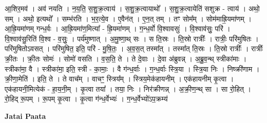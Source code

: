 \documentclass[17pt]{extarticle}
\begin{document}
आ॒शिर॒मव॑ । अव॑ नयति । न॒य॒ति॒ स॒शु॒क्र॒त्वाय॑ । स॒शु॒क्र॒त्वायाथो᳚ । स॒शु॒क्र॒त्वायेति॑ सशुक्र - त्वाय॑ । अथो॒ सम् । अथो॒ इत्यथो᳚ । सम्भ॑रति । भ॒र॒त्ये॒व । ए॒वैन॑त् । ए॒न॒त् तम् । तꣳ सोम᳚म् । सोम॑माह्रि॒यमा॑णम् । आ॒ह्रि॒यमा॑णम् गन्ध॒र्वः । आ॒ह्रि॒यमा॑ण॒मित्या᳚ - ह्रि॒यमा॑णम् । ग॒न्ध॒र्वो वि॒श्वावसुः॑ । वि॒श्वाव॑सुः॒ परि॑ । वि॒श्वाव॑सु॒रिति॑ वि॒श्व - व॒सुः॒ । पर्य॑मुष्णात् । अ॒मु॒ष्णा॒थ् सः । स ति॒स्रः । ति॒स्रो रात्रीः᳚ । रात्रीः॒ परि॑मुषितः । परि॑मुषितोऽवसत् । परि॑मुषित॒ इति॒ परि॑ - मु॒षि॒तः॒ । अ॒व॒स॒त् तस्मा᳚त् । तस्मा᳚त् ति॒स्रः । ति॒स्रो रात्रीः᳚ । रात्रीः᳚ क्री॒तः । क्री॒तः सोमः॑ । सोमो॑ वसति । व॒स॒ति॒ ते । ते दे॒वाः । दे॒वा अ॑ब्रुवन्न् । अ॒ब्रु॒व॒न्थ् स्त्रीका॑माः । स्त्रीका॑मा॒ वै । स्त्रीका॑मा॒ इति॒ स्त्री - का॒माः॒ । वै ग॑न्ध॒र्वाः । ग॒न्ध॒र्वाः स्त्रि॒या । स्त्रि॒या निः । निष्क्री॑णाम । क्री॒णा॒मेति॑ । इति॒ ते । ते वाच᳚म् । वाचꣳ॒॒ स्त्रिय᳚म् । स्त्रिय॒मेक॑हायनीम् । एक॑हायनीम् कृ॒त्वा । एक॑हायनी॒मित्येक॑ - हा॒य॒नी॒म् । कृ॒त्वा तया᳚ । तया॒ निः । निर॑क्रीणन्न् । अ॒क्री॒ण॒न्थ् सा । सा रो॒हित् । रो॒हिद् रू॒पम् । रू॒पम् कृ॒त्वा । कृ॒त्वा ग॑न्ध॒र्वेभ्यः॑ । ग॒न्ध॒र्वेभ्यो॑ऽप॒क्रम्य॑ \newline

\textbf{Jatai Paata} \newline
\end{document}
